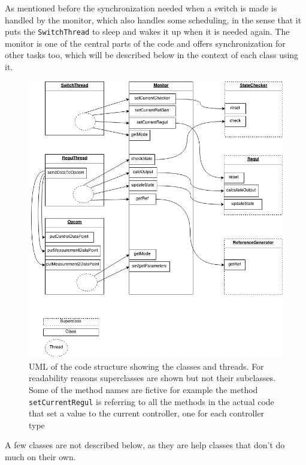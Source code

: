 As mentioned before the synchronization needed when a switch is made is handled by the monitor, which also handles some scheduling, in the sense that it puts the \texttt{SwitchThread} to sleep and wakes it up when it is needed again.
The monitor is one of the central parts of the code and offers synchronization for other tasks too, which will be described below in the context of each class using it. 
\begin{figure}
\centering
\includegraphics[width=\textwidth]{figures/UML.png}
\caption{UML of the code structure showing the classes and threads. For readability reasons superclasses are shown but not their subclasses. Some of the method names are fictive for example the method \texttt{setCurrentRegul} is referring to all the methods in the actual code that set a value to the current controller, one for each controller type}
\label{overall_fig}
\end{figure}

A few classes are not described below, as they are help classes that don't do much on their own. %



